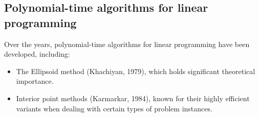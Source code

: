 \subsection*{Polynomial-time algorithms for linear programming}
Over the years, polynomial-time algorithms for linear programming have been developed, including:
\begin{itemize}
    \item The Ellipsoid method (Khachiyan, 1979), which holds significant theoretical importance.
    \item Interior point methods (Karmarkar, 1984), known for their highly efficient variants when dealing with certain types of problem instances. 
\end{itemize}